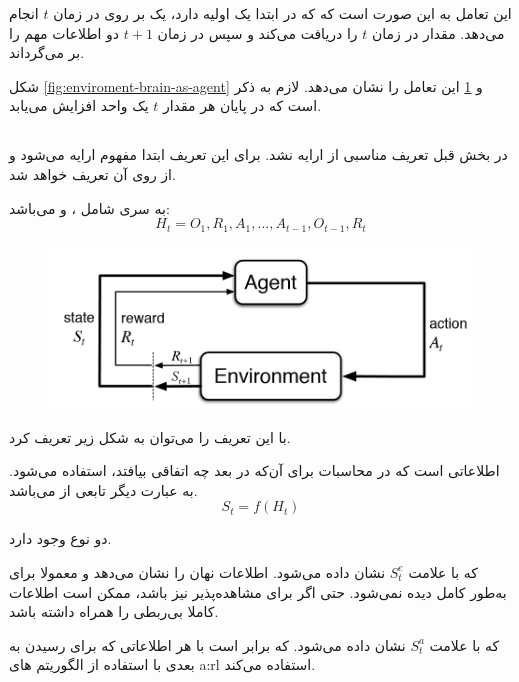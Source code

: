 این تعامل به این صورت است که  که در ابتدا یک  اولیه دارد، یک  بر روی  در زمان $t$ انجام می‌دهد. 
 مقدار  در زمان $t$ را دریافت می‌کند و 
سپس  در زمان $t+1$ دو اطلاعات مهم را بر می‌گرداند. 
\begin{alphinline}
	\item {}
	\item {}
\end{alphinline}

شکل 
\ref{fig:enviroment-brain-as-agent}
و \ref{fig:markov-chain-sarsa}
این تعامل را نشان می‌دهد. لازم به ذکر است که در پایان هر  مقدار $t$ یک واحد افزایش می‌یابد.

\subsection{}
در بخش قبل تعریف مناسبی از  ارایه نشد. برای این تعریف ابتدا مفهوم  ارایه می‌شود و از روی آن  تعریف خواهد شد.

\begin{definition}[\w{history}]
	به سری شامل ،  و  می‌باشد:
	\[
	H_t = O_1 ,R_1, A_1, \dots, A_{t-1}, O_{t-1}, R_t
	\]
\end{definition}


\begin{figure}[t]
	\centering
	\includegraphics[width=0.7\linewidth]{Figures/RL/Markov-vhain-SARSA}
	\caption{}
	\label{fig:markov-chain-sarsa}
\end{figure}

با این تعریف  را می‌توان به شکل زیر تعریف کرد.

\begin{definition}\label{def:state}
	\textbf{}
	اطلاعاتی است که در محاسبات برای آن‌که در بعد چه اتفاقی بیافتد، استفاده می‌شود. به عبارت دیگر  تابعی از  می‌باشد.
	\[
	S_t = f(H_t)
	\]
\end{definition}

دو نوع  وجود دارد.
\begin{alphabetlist}
	\item \textbf{} که با علامت $S_t^e$ نشان داده می‌شود.
	اطلاعات نهان  را نشان می‌دهد و معمولا برای  به‌طور کامل دیده نمی‌شود. حتی اگر برای  مشاهده‌پذیر نیز باشد، ممکن است اطلاعات کاملا بی‌ربطی را همراه داشته باشد.
	\item \textbf{} که با علامت $S_t^a$ نشان داده می‌شود.
	که برابر است با هر اطلاعاتی که  برای رسیدن به  بعدی با استفاده از الگوریتم های \gls{a:rl} استفاده می‌کند. 
\end{alphabetlist}

